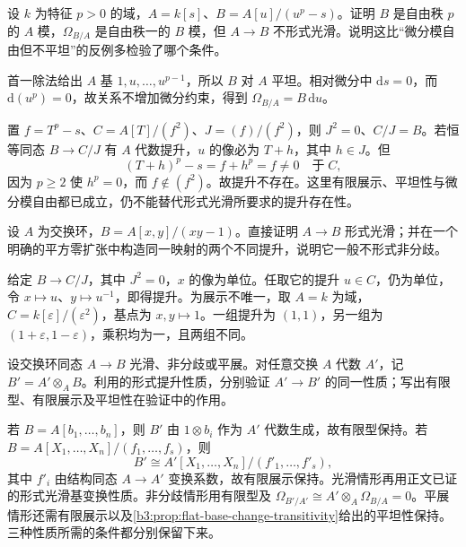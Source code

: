 \begin{exercise}\label{b3:ex:14-free-differentials-not-smooth}
	设 \(k\) 为特征 \(p>0\) 的域，\(A=k[s]\)、\(B=A[u]/(u^p-s)\)。证明 \(B\) 是自由秩 \(p\) 的 \(A\) 模，\(\Omega_{B/A}\) 是自由秩一的 \(B\) 模，但 \(A\to B\) 不形式光滑。说明这比“微分模自由但不平坦”的反例多检验了哪个条件。
\end{exercise}
\begin{solution}
	首一除法给出 \(A\) 基 \(1,u,\ldots,u^{p-1}\)，所以 \(B\) 对 \(A\) 平坦。相对微分中 \(\mathrm{d}s=0\)，而 \(\mathrm{d}(u^p)=0\)，故关系不增加微分约束，得到 \(\Omega_{B/A}=B\,\mathrm{d}u\)。

	置 \(f=T^p-s\)、\(C=A[T]/(f^2)\)、\(J=(f)/(f^2)\)，则 \(J^2=0\)、\(C/J=B\)。若恒等同态 \(B\to C/J\) 有 \(A\) 代数提升，\(u\) 的像必为 \(T+h\)，其中 \(h\in J\)。但
	\[
		(T+h)^p-s=f+h^p=f\ne0\quad\text{于}\;C,
	\]
	因为 \(p\ge2\) 使 \(h^p=0\)，而 \(f\notin(f^2)\)。故提升不存在。这里有限展示、平坦性与微分模自由都已成立，仍不能替代形式光滑所要求的提升存在性。
\end{solution}

\begin{exercise}\label{b3:ex:14-smooth-hyperbola-lifting}
	设 \(A\) 为交换环，\(B=A[x,y]/(xy-1)\)。直接证明 \(A\to B\) 形式光滑；并在一个明确的平方零扩张中构造同一映射的两个不同提升，说明它一般不形式非分歧。
\end{exercise}
\begin{solution}
	给定 \(B\to C/J\)，其中 \(J^2=0\)，\(x\) 的像为单位。任取它的提升 \(u\in C\)，仍为单位，令 \(x\mapsto u\)、\(y\mapsto u^{-1}\)，即得提升。为展示不唯一，取 \(A=k\) 为域，\(C=k[\varepsilon]/(\varepsilon^2)\)，基点为 \(x,y\mapsto1\)。一组提升为 \((1,1)\)，另一组为 \((1+\varepsilon,1-\varepsilon)\)，乘积均为一，且两组不同。
\end{solution}

\begin{exercise}\label{b3:ex:14-formal-base-change}
	设交换环同态 \(A\to B\) 光滑、非分歧或平展。对任意交换 \(A\) 代数 \(A'\)，记 \(B'=A'\otimes_AB\)。利用的形式提升性质，分别验证 \(A'\to B'\) 的同一性质；写出有限型、有限展示及平坦性在验证中的作用。
\end{exercise}
\begin{solution}
	若 \(B=A[b_1,\ldots,b_n]\)，则 \(B'\) 由 \(1\otimes b_i\) 作为 \(A'\) 代数生成，故有限型保持。若 \(B=A[X_1,\ldots,X_n]/(f_1,\ldots,f_s)\)，则
	\[
		B'\cong A'[X_1,\ldots,X_n]/(f'_1,\ldots,f'_s),
	\]
	其中 \(f'_i\) 由结构同态 \(A\to A'\) 变换系数，故有限展示保持。光滑情形再用正文已证的形式光滑基变换性质。非分歧情形用有限型及 \(\Omega_{B'/A'}\cong A'\otimes_A\Omega_{B/A}=0\)。平展情形还需有限展示以及\cref{b3:prop:flat-base-change-transitivity}给出的平坦性保持。三种性质所需的条件都分别保留下来。
\end{solution}

